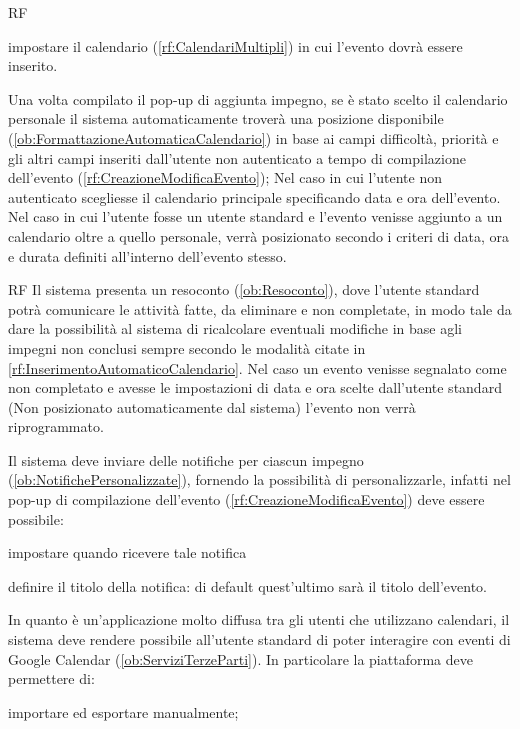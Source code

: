\begin{listaPersonale}{RF}
\begin{listaPersonale2}[RF]{}
		 impostare il calendario (\ref{rf:CalendariMultipli}) in cui l'evento dovrà essere inserito.
	\end{listaPersonale2}

	 Una volta compilato il pop-up di aggiunta impegno, se è stato scelto il calendario personale il sistema automaticamente troverà una posizione disponibile (\ref{ob:FormattazioneAutomaticaCalendario}) in base ai campi difficoltà, priorità e gli altri campi inseriti dall'utente non autenticato a tempo di compilazione dell'evento (\ref{rf:CreazioneModificaEvento}); Nel caso in cui l'utente non autenticato scegliesse il calendario principale specificando data e ora dell'evento. Nel caso in cui l'utente fosse un utente standard e l'evento venisse aggiunto a un calendario oltre a quello personale, verrà posizionato secondo i criteri di data, ora e durata definiti all'interno dell'evento stesso.
	\begin{listaPersonale2}{RF}
		 Il sistema presenta un resoconto (\ref{ob:Resoconto}), dove l'utente standard potrà comunicare le attività fatte, da eliminare e non completate, in modo tale da dare la possibilità al sistema di ricalcolare eventuali modifiche in base agli impegni non conclusi sempre secondo le modalità citate in \ref{rf:InserimentoAutomaticoCalendario}. Nel caso un evento venisse segnalato come non completato e avesse le impostazioni di data e ora scelte dall'utente standard (Non posizionato automaticamente dal sistema) l'evento non verrà riprogrammato.
	\end{listaPersonale2}

	 Il sistema deve inviare delle notifiche per ciascun impegno (\ref{ob:NotifichePersonalizzate}), fornendo la possibilità di personalizzarle, infatti nel pop-up di compilazione dell'evento (\ref{rf:CreazioneModificaEvento}) deve essere possibile:
	\begin{listaPersonale2}[RF]{}
		 impostare quando ricevere tale notifica

		 definire il titolo della notifica: di default quest'ultimo sarà il titolo dell'evento.
	\end{listaPersonale2}

	 In quanto è un'applicazione molto diffusa tra gli utenti che utilizzano calendari, il sistema deve rendere possibile all'utente standard di poter interagire con eventi di Google Calendar (\ref{ob:ServiziTerzeParti}). In particolare la piattaforma deve permettere di:
	\begin{listaPersonale2}[RF]{}
		 importare ed esportare manualmente;


\end{listaPersonale2}
\end{listaPersonale}
